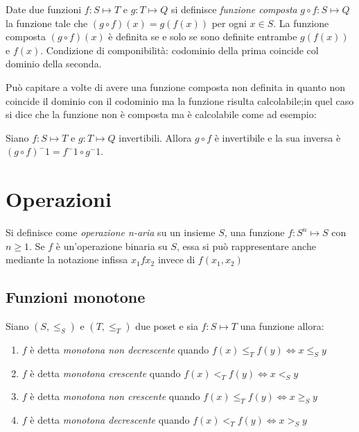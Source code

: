 Date due funzioni $f:S \mapsto T$ e $g:T \mapsto Q$ si definisce \emph{funzione composta}
$g \circ f:S \mapsto Q$ la funzione tale che $(g \circ f)(x) = g(f(x))$ per ogni $x \in S$.
La funzione composta $(g \circ f)(x)$ è definita se e solo se sono definite entrambe
$g(f(x))$ e $f(x)$. 
Condizione di componibilità: codominio della prima coincide col dominio della seconda.


Può capitare a volte di avere una funzione composta non definita in quanto non coincide
il dominio con il codominio ma la funzione risulta calcolabile;in quel caso si dice
che la funzione non è composta ma è calcolabile come ad esempio:


\begin{thm}
Siano $f:S \mapsto T$ e $g:T \mapsto Q$ invertibili. Allora $g \circ f$ è invertibile
e la sua inversa è $(g \circ f) ^ -1 = f^-1 \circ g ^ -1$.
\end{thm}

\section{Operazioni}
Si definisce come \emph{operazione n-aria} su un insieme $S$, una funzione
$f:S^n \mapsto S$ con $n \geq 1$.
Se $f$ è un'operazione binaria su $S$, essa si può rappresentare anche mediante
la notazione infissa $x_1 f x_2$ invece di $f(x_1,x_2)$


\subsection{Funzioni monotone}
\begin{defi}
    Siano $(S,\leq _S)$ e $(T,\leq _T)$ due poset e sia $f:S \mapsto T$ una funzione allora:
\end{defi}
\begin{enumerate}
    \item $f$ è detta \emph{monotona non decrescente} quando $f(x) \leq_T f(y) \iff x \leq_S y$
    \item $f$ è detta \emph{monotona crescente} quando $f(x) <_T f(y) \iff x <_S y$
    \item $f$ è detta \emph{monotona non crescente} quando $f(x) \leq_T f(y) \iff x \geq_S y$
    \item $f$ è detta \emph{monotona decrescente} quando $f(x) <_T f(y) \iff x >_S y$
\end{enumerate}
